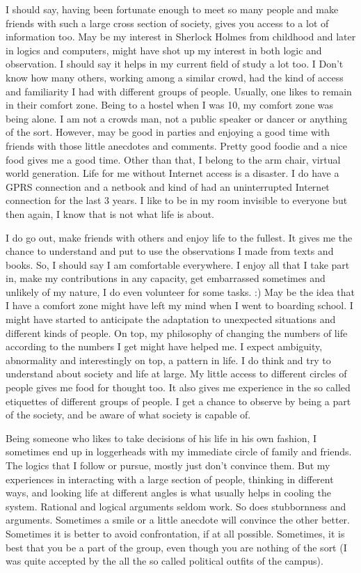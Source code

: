 {I should say, having been fortunate enough to meet so many people and make friends with such a 
large cross section of society, gives you access to a lot of information too. May be my interest
in Sherlock Holmes from childhood and later in logics and computers, might have shot up my interest 
in both logic and observation. I should say it helps in my current field of study a lot too. I Don't 
know how many others, working among a similar crowd, had the kind of access and familiarity I had with
different groups of people. Usually, one likes to remain in their comfort zone. Being to a hostel 
when I was 10, my comfort zone was being alone. I am not a crowds man, not a public speaker or dancer 
or anything of the sort. However, may be good in parties and enjoying a good time with friends with those little anecdotes
and comments. Pretty good foodie and a nice food gives me a good time. Other than that, I belong to 
the arm chair, virtual world generation. Life for me without Internet access is a disaster. I do have
a GPRS connection and a netbook and kind of had an uninterrupted Internet connection for the last 3 years. I like to 
be in my room invisible to everyone but then again, I know that is not what life is about. 

I do go out, make friends with others and enjoy life to the fullest. It gives me the chance to understand 
and put to use the observations I made from texts and books. So, I should say I am comfortable
everywhere. I enjoy all that I take part in, make my contributions in any capacity, get embarrassed
sometimes and unlikely of my nature, I do even volunteer for some tasks. :) May be the idea that I
have a comfort zone might have left my mind when I went to boarding school. I might have started to anticipate the adaptation to 
unexpected situations and different kinds of people. On top, 
my philosophy of changing the numbers of life according to the numbers I get might have helped me. I 
expect ambiguity, abnormality and interestingly on top, a pattern in life. I do think and try to
understand about society and life at large. My little access to different circles of people gives 
me food for thought too. It also gives me experience in the so called etiquettes of different 
groups of people. I get a chance to observe by being a part of the society, and be aware of what society 
is capable of. 

Being someone who likes to take decisions of his life in his own fashion, I sometimes end up in
loggerheads with my immediate circle of family and friends. The logics that I follow or pursue, mostly 
just don't convince them. But my experiences in interacting with a large section of people, thinking 
in different ways, and looking life at different angles is what usually helps in cooling the system.
Rational and logical arguments seldom work. So does stubbornness and arguments. Sometimes a smile or 
a little anecdote will convince the other better. Sometimes it is better to avoid confrontation, if at 
all possible. Sometimes, it is best that you be a part of the group, even though you are nothing of the 
sort (I was quite accepted by the all the so called political outfits of the campus). 

}
